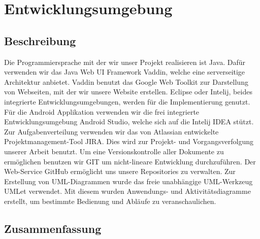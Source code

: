 \chapter{Entwicklungsumgebung}
\section{Beschreibung}
Die Programmiersprache mit der wir unser Projekt realisieren ist Java. Dafür verwenden wir das Java Web UI Framework Vaddin, welche eine serverseitige Architektur anbietet. Vaddin benutzt das Google Web Toolkit zur Darstellung von Webseiten, mit der wir unsere Website erstellen. Eclipse oder Intelij, beides integrierte Entwicklungsumgebungen, werden für die Implementierung genutzt. Für die Android Applikation verwenden wir die frei integrierte Entwicklungsumgebung Android Studio, welche sich auf die Intelij IDEA stützt.\newline
\linebreak
Zur Aufgabenverteilung verwenden wir das von Atlassian entwickelte Projektmanagement-Tool JIRA. Dies wird zur Projekt- und Vorgangsverfolgung unserer Arbeit benutzt. 
Um eine Versionskontrolle aller Dokumente zu ermöglichen benutzen wir GIT um nicht-lineare Entwicklung durchzuführen. 
Der Web-Service GitHub ermöglicht uns unsere Repositories zu verwalten. \newline
\linebreak
Zur Erstellung von UML-Diagrammen wurde das freie unabhängige UML-Werkzeug UMLet verwendet.  Mit diesem wurden Anwendungs- und Aktivitätsdiagramme erstellt, um bestimmte Bedienung und Abläufe zu veranschaulichen.
\section{Zusammenfassung}